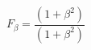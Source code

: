 \documentclass[]{article}
\title{}
\author{}
\begin{document}
\maketitle

\begin{abstract}

\end{abstract}

\[F_{\beta} = \displaystyle\frac{(1+\beta^2)}{(1+\beta^2)}\]
\end{document}
